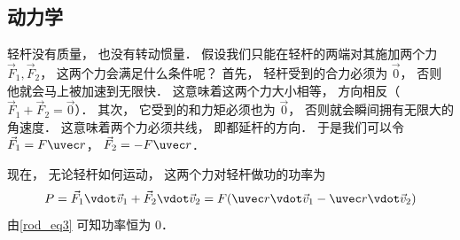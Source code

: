 \subsection{动力学}
轻杆没有质量， 也没有转动惯量． 假设我们只能在轻杆的两端对其施加两个力 $\vec F_1, \vec F_2$， 这两个力会满足什么条件呢？ 首先， 轻杆受到的合力必须为 $\vec 0$， 否则他就会马上被加速到无限快． 这意味着这两个力大小相等， 方向相反（$\vec F_1 + \vec F_2 = \vec 0$）． 其次， 它受到的和力矩必须也为 $\vec 0$， 否则就会瞬间拥有无限大的角速度． 这意味着两个力必须共线， 即都延杆的方向． 于是我们可以令 $\vec F_1 = F \uvec r$， $\vec F_2 = -F \uvec r$．

现在， 无论轻杆如何运动， 这两个力对轻杆做功的功率为
\begin{equation}
P = \vec F_1 \vdot \vec v_1 + \vec F_2 \vdot \vec v_2 = F (\uvec r \vdot \vec v_1 - \uvec r \vdot \vec v_2)
\end{equation}
由\autoref{rod_eq3} 可知功率恒为 0．
